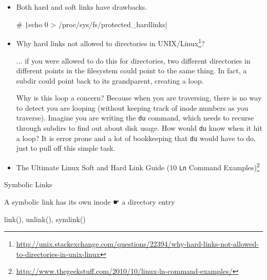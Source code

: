 \begin{itemize}
\item Both hard and soft links have drawbacks.
\item[\#] \texttt|echo 0 > /proc/sys/fs/protected_hardlinks|
\item Why hard links not allowed to directories in
  UNIX/Linux\footnote{\url{http://unix.stackexchange.com/questions/22394/why-hard-links-not-allowed-to-directories-in-unix-linux}}?
  
  ... if you were allowed to do this for directories, two different directories in
  different points in the filesystem could point to the same thing. In fact, a subdir
  could point back to its grandparent, creating a loop.

  Why is this loop a concern? Because when you are traversing, there is no way to detect
  you are looping (without keeping track of inode numbers as you traverse). Imagine you
  are writing the \texttt{du} command, which needs to recurse through subdirs to find out about
  disk usage. How would \texttt{du} know when it hit a loop? It is error prone and a lot of
  bookkeeping that \texttt{du} would have to do, just to pull off this simple task.
\item The Ultimate Linux Soft and Hard Link Guide (10 \texttt{Ln} Command
  Examples)\footnote{\url{http://www.thegeekstuff.com/2010/10/linux-ln-command-examples/}}
\end{itemize}

\begin{frame}{Symbolic Links}
  \begin{iblock}{A symbolic link has its own inode {☛} a directory entry}
    \begin{center}
    \end{center}
  \end{iblock}
\end{frame}

\begin{frame}{\ttfamily link(), unlink(), symlink()}
  \begin{center}
  \end{center}
\end{frame}

